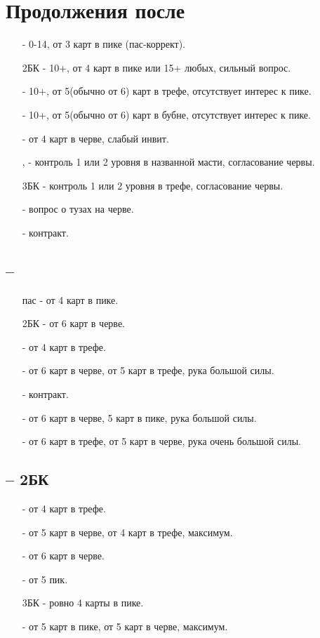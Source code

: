\documentclass{article}
\begin{document}
\section{Продолжения после }
\begin{enumerate}
    \item[\sp{2}] - 0-14, от 3 карт в пике (пас-коррект).
    \item[2БК] - 10+, от 4 карт в пике или 15+ любых, сильный вопрос.
     \item[\cl{3}] - 10+, от 5(обычно от 6) карт в трефе, отсутствует интерес к пике. 
    \item[\di{3}] - 10+, от 5(обычно от 6) карт в бубне, отсутствует интерес к пике. 
    \item[\he{3}] - от 4 карт в черве, слабый инвит.
    \item[\sp{3}, \di{4}] - контроль 1 или 2 уровня в названной масти, согласование червы.
    \item[3БК] - контроль 1 или 2 уровня в трефе, согласование червы.
    \item[\cl{4}] - вопрос о тузах на черве.
    \item[\he{4}] - контракт.
\end{enumerate}
\subsection{ -- }
\begin{enumerate}
    \item[пас] - от 4 карт в пике.
    \item[2БК] - от 6 карт в черве.
    \item[\cl{3}] - от 4 карт в трефе.
    \item[\di{3}] - от 6 карт в черве, от 5 карт в трефе, рука большой силы.
    \item[\he{3}] - контракт.
    \item[\sp{3}] - от 6 карт в черве, 5 карт в пике, рука большой силы.
    \item[\cl{4}] - от 6 карт в трефе, от 5 карт в черве, рука очень большой силы.
\end{enumerate}
\subsection{ -- 2БК}
\begin{enumerate}
    \item[\cl{3}] - от 4 карт в трефе.
    \item[\di{3}] - от 5 карт в черве, от 4 карт в трефе, максимум.
    \item[\he{3}] - от 6 карт в черве.
    \item[\sp{3}] - от 5 пик.
    \item[3БК] - ровно 4 карты в пике.
    \item[\he{4}] - от 5 карт в пике, от 5 карт в черве, максимум.
\end{enumerate}
\end{document}
